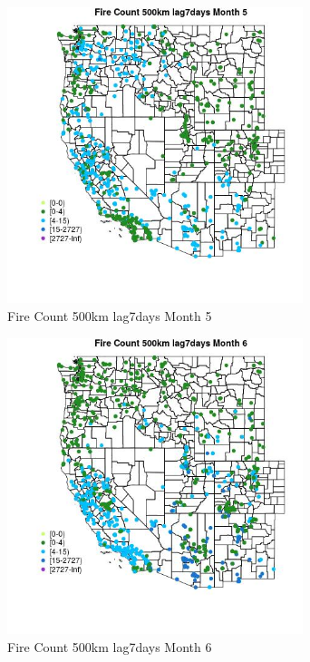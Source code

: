 \begin{figure} 
\centering  
\includegraphics[width=0.77\textwidth]{Code_Outputs/Report_ML_input_PM25_Step4_part_f_de_duplicated_aves_prioritize_24hr_obswNAs_MapObsMo5Fire_Count_500km_lag7days.jpg} 
\caption{\label{fig:Report_ML_input_PM25_Step4_part_f_de_duplicated_aves_prioritize_24hr_obswNAsMapObsMo5Fire_Count_500km_lag7days}Fire Count 500km lag7days Month 5} 
\end{figure} 
 

\clearpage 

\begin{figure} 
\centering  
\includegraphics[width=0.77\textwidth]{Code_Outputs/Report_ML_input_PM25_Step4_part_f_de_duplicated_aves_prioritize_24hr_obswNAs_MapObsMo6Fire_Count_500km_lag7days.jpg} 
\caption{\label{fig:Report_ML_input_PM25_Step4_part_f_de_duplicated_aves_prioritize_24hr_obswNAsMapObsMo6Fire_Count_500km_lag7days}Fire Count 500km lag7days Month 6} 
\end{figure} 
 

